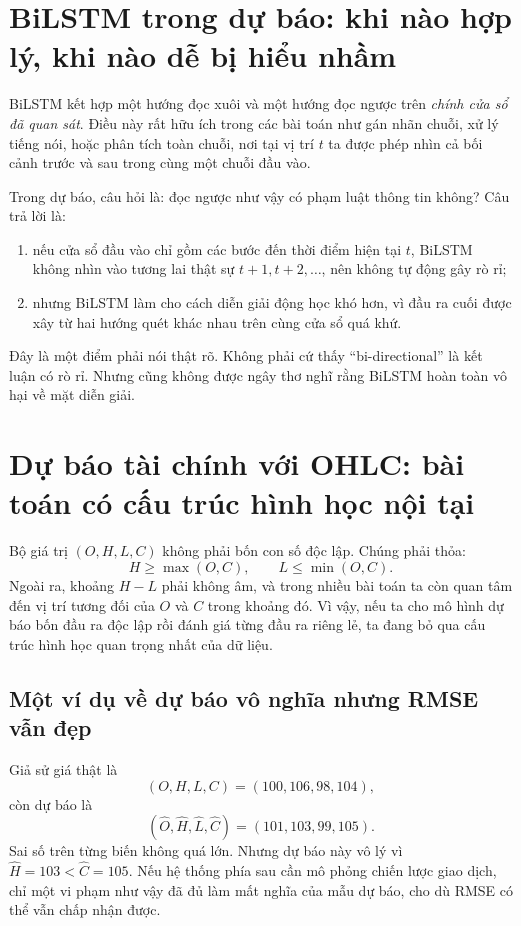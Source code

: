 \section{BiLSTM trong dự báo: khi nào hợp lý, khi nào dễ bị hiểu nhầm}

BiLSTM kết hợp một hướng đọc xuôi và một hướng đọc ngược trên \emph{chính cửa sổ đã quan sát}. Điều này rất hữu ích trong các bài toán như gán nhãn chuỗi, xử lý tiếng nói, hoặc phân tích toàn chuỗi, nơi tại vị trí \(t\) ta được phép nhìn cả bối cảnh trước và sau trong cùng một chuỗi đầu vào.

Trong dự báo, câu hỏi là: đọc ngược như vậy có phạm luật thông tin không? Câu trả lời là:

\begin{enumerate}
\item nếu cửa sổ đầu vào chỉ gồm các bước đến thời điểm hiện tại \(t\), BiLSTM không nhìn vào tương lai thật sự \(t+1,t+2,\dots\), nên không tự động gây rò rỉ;
\item nhưng BiLSTM làm cho cách diễn giải động học khó hơn, vì đầu ra cuối được xây từ hai hướng quét khác nhau trên cùng cửa sổ quá khứ.
\end{enumerate}

Đây là một điểm phải nói thật rõ. Không phải cứ thấy ``bi-directional'' là kết luận có rò rỉ. Nhưng cũng không được ngây thơ nghĩ rằng BiLSTM hoàn toàn vô hại về mặt diễn giải.

\section{Dự báo tài chính với OHLC: bài toán có cấu trúc hình học nội tại}

Bộ giá trị \((O,H,L,C)\) không phải bốn con số độc lập. Chúng phải thỏa:
\[
H\ge \max(O,C),\qquad L\le \min(O,C).
\]
Ngoài ra, khoảng \(H-L\) phải không âm, và trong nhiều bài toán ta còn quan tâm đến vị trí tương đối của \(O\) và \(C\) trong khoảng đó. Vì vậy, nếu ta cho mô hình dự báo bốn đầu ra độc lập rồi đánh giá từng đầu ra riêng lẻ, ta đang bỏ qua cấu trúc hình học quan trọng nhất của dữ liệu.

\subsection{Một ví dụ về dự báo vô nghĩa nhưng RMSE vẫn đẹp}

Giả sử giá thật là
\[
(O,H,L,C)=(100,106,98,104),
\]
còn dự báo là
\[
(\hat{O},\hat{H},\hat{L},\hat{C})=(101,103,99,105).
\]
Sai số trên từng biến không quá lớn. Nhưng dự báo này vô lý vì \(\hat{H}=103<\hat{C}=105\). Nếu hệ thống phía sau cần mô phỏng chiến lược giao dịch, chỉ một vi phạm như vậy đã đủ làm mất nghĩa của mẫu dự báo, cho dù RMSE có thể vẫn chấp nhận được.


